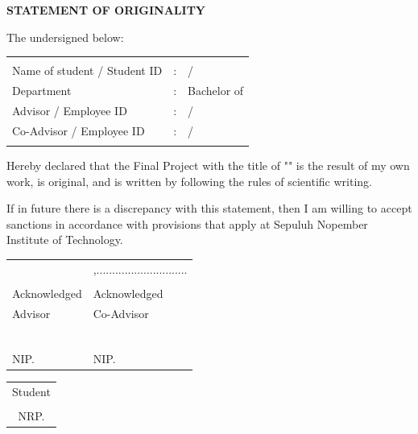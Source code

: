 \begin{center}
  \large
  \textbf{STATEMENT OF ORIGINALITY}
\end{center}

\thispagestyle{empty}

\vspace{2ex}


\noindent The undersigned below:

\noindent\begin{tabularx}{\textwidth}{l l X}
                        &   &                            \\
  Name of student / Student ID & : & \name{} / \nrp{}           \\
  Department            & : & Bachelor of \engdepartment{}           \\
  Advisor /  Employee ID         & : & \advisor{} / \advisornip{} \\
  Co-Advisor /  Employee ID      & : & \coadvisor{} / \coadvisornip{} \\

                        &   &                            \\
\end{tabularx}

Hereby declared that the Final Project with the title of "\engtatitle{}" is the result of my own work, is original, and is written by following the rules of scientific writing.

If in future there is a discrepancy with this statement, then I am willing to accept sanctions in accordance with provisions that apply at Sepuluh Nopember Institute of Technology.

\vspace{8ex}

\noindent\begin{tabularx}{\textwidth}{X l}
                     & \place{},............................. \\
                     &                                   \\
  Acknowledged       & Acknowledged                      \\
  Advisor            & Co-Advisor                        \\
                     &                                   \\
                     &                                   \\
                     &                                   \\
                     &                                   \\
                     &                                   \\
  \advisor{}         & \coadvisor{}                           \\
  NIP. \advisornip{} & NIP. \coadvisornip{}                       \\
\end{tabularx}

\noindent
\begin{center}
\begin{tabular}{c}
Student \\[5em]
\name{} \\
NRP. \nrp{}
\end{tabular}
\end{center}